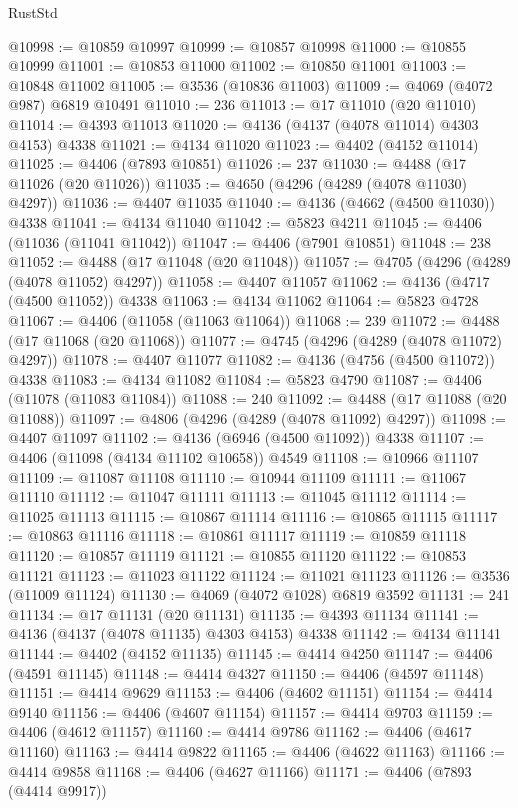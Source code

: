 \begin{lexlean}{RustStd}
\begin{coremodule}
{\begin{coremodule}
{{{{{{{{{{{{{{{{{{{{{{{{{{{{{{{{{{{{{{{{{{{{{{{{{{@10998 := @10859 @10997
@10999 := @10857 @10998
@11000 := @10855 @10999
@11001 := @10853 @11000
@11002 := @10850 @11001
@11003 := @10848 @11002
@11005 := @3536 (@10836 @11003)
@11009 := @4069 (@4072 @987) @6819 @10491
@11010 := 236
@11013 := @17 @11010 (@20 @11010)
@11014 := @4393 @11013
@11020 := @4136 (@4137 (@4078 @11014) @4303 @4153) @4338
@11021 := @4134 @11020
@11023 := @4402 (@4152 @11014)
@11025 := @4406 (@7893 @10851)
@11026 := 237
@11030 := @4488 (@17 @11026 (@20 @11026))
@11035 := @4650 (@4296 (@4289 (@4078 @11030) @4297))
@11036 := @4407 @11035
@11040 := @4136 (@4662 (@4500 @11030)) @4338
@11041 := @4134 @11040
@11042 := @5823 @4211
@11045 := @4406 (@11036 (@11041 @11042))
@11047 := @4406 (@7901 @10851)
@11048 := 238
@11052 := @4488 (@17 @11048 (@20 @11048))
@11057 := @4705 (@4296 (@4289 (@4078 @11052) @4297))
@11058 := @4407 @11057
@11062 := @4136 (@4717 (@4500 @11052)) @4338
@11063 := @4134 @11062
@11064 := @5823 @4728
@11067 := @4406 (@11058 (@11063 @11064))
@11068 := 239
@11072 := @4488 (@17 @11068 (@20 @11068))
@11077 := @4745 (@4296 (@4289 (@4078 @11072) @4297))
@11078 := @4407 @11077
@11082 := @4136 (@4756 (@4500 @11072)) @4338
@11083 := @4134 @11082
@11084 := @5823 @4790
@11087 := @4406 (@11078 (@11083 @11084))
@11088 := 240
@11092 := @4488 (@17 @11088 (@20 @11088))
@11097 := @4806 (@4296 (@4289 (@4078 @11092) @4297))
@11098 := @4407 @11097
@11102 := @4136 (@6946 (@4500 @11092)) @4338
@11107 := @4406 (@11098 (@4134 @11102 @10658)) @4549
@11108 := @10966 @11107
@11109 := @11087 @11108
@11110 := @10944 @11109
@11111 := @11067 @11110
@11112 := @11047 @11111
@11113 := @11045 @11112
@11114 := @11025 @11113
@11115 := @10867 @11114
@11116 := @10865 @11115
@11117 := @10863 @11116
@11118 := @10861 @11117
@11119 := @10859 @11118
@11120 := @10857 @11119
@11121 := @10855 @11120
@11122 := @10853 @11121
@11123 := @11023 @11122
@11124 := @11021 @11123
@11126 := @3536 (@11009 @11124)
@11130 := @4069 (@4072 @1028) @6819 @3592
@11131 := 241
@11134 := @17 @11131 (@20 @11131)
@11135 := @4393 @11134
@11141 := @4136 (@4137 (@4078 @11135) @4303 @4153) @4338
@11142 := @4134 @11141
@11144 := @4402 (@4152 @11135)
@11145 := @4414 @4250
@11147 := @4406 (@4591 @11145)
@11148 := @4414 @4327
@11150 := @4406 (@4597 @11148)
@11151 := @4414 @9629
@11153 := @4406 (@4602 @11151)
@11154 := @4414 @9140
@11156 := @4406 (@4607 @11154)
@11157 := @4414 @9703
@11159 := @4406 (@4612 @11157)
@11160 := @4414 @9786
@11162 := @4406 (@4617 @11160)
@11163 := @4414 @9822
@11165 := @4406 (@4622 @11163)
@11166 := @4414 @9858
@11168 := @4406 (@4627 @11166)
@11171 := @4406 (@7893 (@4414 @9917))
}}}}}}}}}}}}}}}}}}}}}}}}}}}}}}}}}}}}}}}}}}}}}}}}}}
\end{coremodule}}
\end{coremodule}
\end{lexlean}

